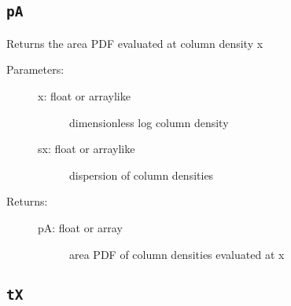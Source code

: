 \documentclass[letterpaper,10pt,english]{sphinxmanual}
\begin{document}
\subsection{\texttt{pA}}
\label{fulldoc:pa}

\begin{fulllineitems}
\label{fulldoc:despotic.winds.pwind_util.pA}
Returns the area PDF evaluated at column density x
\begin{description}
\item[{Parameters:}] \leavevmode\begin{description}
\item[{x: float or arraylike}] \leavevmode
dimensionless log column density

\item[{sx: float or arraylike}] \leavevmode
dispersion of column densities

\end{description}

\item[{Returns:}] \leavevmode\begin{description}
\item[{pA: float or array}] \leavevmode
area PDF of column densities evaluated at x

\end{description}

\end{description}

\end{fulllineitems}



\subsection{\texttt{tX}}
\label{fulldoc:tx}
\end{document}
